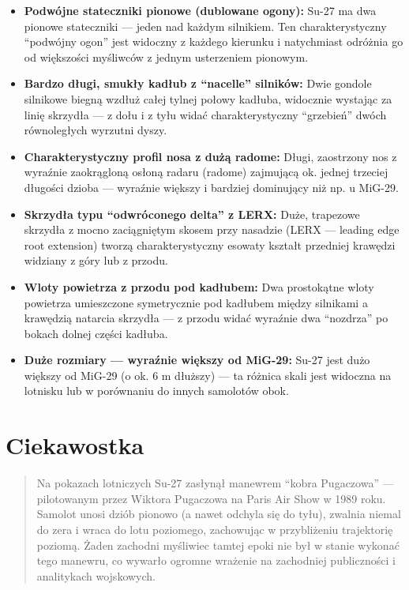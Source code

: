 \documentclass[12pt,openany,oneside]{book}
\providecommand{\tightlist}{%
  \setlength{\itemsep}{0pt}\setlength{\parskip}{0pt}}
\begin{document}
\begin{itemize}
\tightlist
\item
  \textbf{Podwójne stateczniki pionowe (dublowane ogony):} Su-27 ma dwa
  pionowe stateczniki --- jeden nad każdym silnikiem. Ten
  charakterystyczny ``podwójny ogon'' jest widoczny z każdego kierunku i
  natychmiast odróżnia go od większości myśliwców z jednym usterzeniem
  pionowym.
\item
  \textbf{Bardzo długi, smukły kadłub z ``nacelle'' silników:} Dwie
  gondole silnikowe biegną wzdłuż całej tylnej połowy kadłuba, widocznie
  wystając za linię skrzydła --- z dołu i z tyłu widać charakterystyczny
  ``grzebień'' dwóch równoległych wyrzutni dyszy.
\item
  \textbf{Charakterystyczny profil nosa z dużą radome:} Długi,
  zaostrzony nos z wyraźnie zaokrągloną osłoną radaru (radome) zajmującą
  ok. jednej trzeciej długości dzioba --- wyraźnie większy i bardziej
  dominujący niż np. u MiG-29.
\item
  \textbf{Skrzydła typu ``odwróconego delta'' z LERX:} Duże, trapezowe
  skrzydła z mocno zaciągniętym skosem przy nasadzie (LERX --- leading
  edge root extension) tworzą charakterystyczny esowaty kształt
  przedniej krawędzi widziany z góry lub z przodu.
\item
  \textbf{Wloty powietrza z przodu pod kadłubem:} Dwa prostokątne wloty
  powietrza umieszczone symetrycznie pod kadłubem między silnikami a
  krawędzią natarcia skrzydła --- z przodu widać wyraźnie dwa
  ``nozdrza'' po bokach dolnej części kadłuba.
\item
  \textbf{Duże rozmiary --- wyraźnie większy od MiG-29:} Su-27 jest dużo
  większy od MiG-29 (o ok. 6 m dłuższy) --- ta różnica skali jest
  widoczna na lotnisku lub w porównaniu do innych samolotów obok.
\end{itemize}

\section{Ciekawostka}\label{ciekawostka-43}

\begin{quote}
Na pokazach lotniczych Su-27 zasłynął manewrem ``kobra Pugaczowa'' ---
pilotowanym przez Wiktora Pugaczowa na Paris Air Show w 1989 roku.
Samolot unosi dziób pionowo (a nawet odchyla się do tyłu), zwalnia
niemal do zera i wraca do lotu poziomego, zachowując w przybliżeniu
trajektorię poziomą. Żaden zachodni myśliwiec tamtej epoki nie był w
stanie wykonać tego manewru, co wywarło ogromne wrażenie na zachodniej
publiczności i analitykach wojskowych.
\end{quote}
\end{document}
